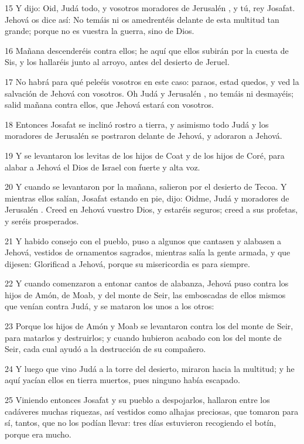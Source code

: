 \par 15 Y dijo: Oid, Judá todo, y vosotros moradores de Jerusalén , y tú, rey Josafat. Jehová os dice así: No temáis ni os amedrentéis delante de esta multitud tan grande; porque no es vuestra la guerra, sino de Dios.
\par 16 Mañana descenderéis contra ellos; he aquí que ellos subirán por la cuesta de Sis, y los hallaréis junto al arroyo, antes del desierto de Jeruel.
\par 17 No habrá para qué peleéis vosotros en este caso: paraos, estad quedos, y ved la salvación de Jehová con vosotros. Oh Judá y Jerusalén , no temáis ni desmayéis; salid mañana contra ellos, que Jehová estará con vosotros. 
\par 18 Entonces Josafat se inclinó rostro a tierra, y asimismo todo Judá y los moradores de Jerusalén  se postraron delante de Jehová, y adoraron a Jehová.
\par 19 Y se levantaron los levitas de los hijos de Coat y de los hijos de Coré, para alabar a Jehová el Dios de Israel con fuerte y alta voz.
\par 20 Y cuando se levantaron por la mañana, salieron por el desierto de Tecoa. Y mientras ellos salían, Josafat estando en pie, dijo: Oidme, Judá y moradores de Jerusalén . Creed en Jehová vuestro Dios, y estaréis seguros; creed a sus profetas, y seréis prosperados.
\par 21 Y habido consejo con el pueblo, puso a algunos que cantasen y alabasen a Jehová, vestidos de ornamentos sagrados, mientras salía la gente armada, y que dijesen: Glorificad a Jehová, porque su misericordia es para siempre.
\par 22 Y cuando comenzaron a entonar cantos de alabanza, Jehová puso contra los hijos de Amón, de Moab, y del monte de Seir, las emboscadas de ellos mismos que venían contra Judá, y se mataron los unos a los otros:
\par 23 Porque los hijos de Amón y Moab se levantaron contra los del monte de Seir, para matarlos y destruirlos; y cuando hubieron acabado con los del monte de Seir, cada cual ayudó a la destrucción de su compañero.
\par 24 Y luego que vino Judá a la torre del desierto, miraron hacia la multitud; y he aquí yacían ellos en tierra muertos, pues ninguno había escapado.
\par 25 Viniendo entonces Josafat y su pueblo a despojarlos, hallaron entre los cadáveres  muchas riquezas, así vestidos como alhajas preciosas, que tomaron para sí, tantos, que no los podían llevar: tres días estuvieron recogiendo el botín, porque era mucho.
